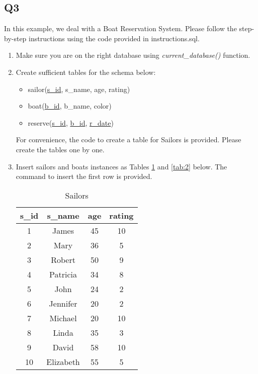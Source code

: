 \documentclass{homework}
\begin{document}
\subsection*{Q3}
In this example, we deal with a Boat Reservation System. Please follow the step-by-step instructions using the code provided in instructions.sql.
\begin{enumerate}[label=\alph*)]
    \item Make sure you are on the right database using \textit{current\_database()} function.
    \item Create sufficient tables for the schema below:
    \begin{itemize}[label=]
        \item sailor(\underline{s\_id}, s\_name, age, rating)
        \item boat(\underline{b\_id}, b\_name, color)
        \item reserve(\underline{s\_id}, \underline{b\_id}, \underline{r\_date})
    \end{itemize}
    For convenience, the code to create a table for Sailors is provided. Please 
    create the tables one by one.
    
    \item Insert sailors and boats instances as Tables \ref{tab:1} and \ref{tab:2} below. The command to insert the first row is provided.
    \begin{table}[!ht]
        \centering
        \begin{tabular}{|c|c|c|c|}
             \hline
             s\_id& s\_name& age& rating\\
             \hline
             1& James& 45& 10\\
             \hline
             2& Mary& 36& 5\\
             \hline
             3& Robert& 50& 9\\
             \hline
             4& Patricia& 34& 8\\
             \hline
             5& John& 24& 2\\
             \hline
             6& Jennifer& 20& 2\\
             \hline
             7& Michael& 20& 10\\
             \hline
             8& Linda& 35& 3\\
             \hline
             9& David& 58& 10\\
             \hline
             10& Elizabeth& 55& 5\\
             \hline
        \end{tabular}
        \caption{Sailors}
        \label{tab:1}


\end{table}
\end{enumerate}
\end{document}
